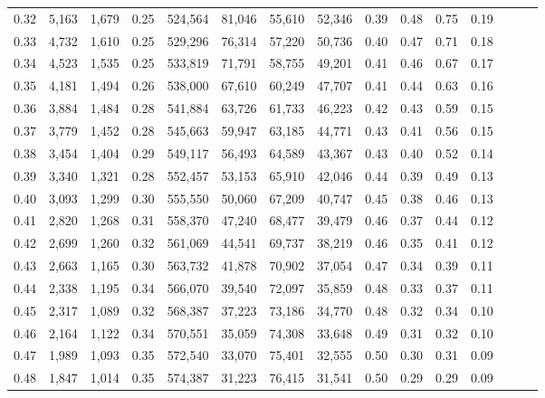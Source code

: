 \begin{tabular}{rrrrrrrrrrrrrrr}
0.32 &   5,163 &  1,679 &  0.25 &  524,564 &   81,046 &   55,610 &   52,346 &  0.39 &  0.48 &  0.75 &      0.19 \\
0.33 &   4,732 &  1,610 &  0.25 &  529,296 &   76,314 &   57,220 &   50,736 &  0.40 &  0.47 &  0.71 &      0.18 \\
0.34 &   4,523 &  1,535 &  0.25 &  533,819 &   71,791 &   58,755 &   49,201 &  0.41 &  0.46 &  0.67 &      0.17 \\
0.35 &   4,181 &  1,494 &  0.26 &  538,000 &   67,610 &   60,249 &   47,707 &  0.41 &  0.44 &  0.63 &      0.16 \\
0.36 &   3,884 &  1,484 &  0.28 &  541,884 &   63,726 &   61,733 &   46,223 &  0.42 &  0.43 &  0.59 &      0.15 \\
0.37 &   3,779 &  1,452 &  0.28 &  545,663 &   59,947 &   63,185 &   44,771 &  0.43 &  0.41 &  0.56 &      0.15 \\
0.38 &   3,454 &  1,404 &  0.29 &  549,117 &   56,493 &   64,589 &   43,367 &  0.43 &  0.40 &  0.52 &      0.14 \\
0.39 &   3,340 &  1,321 &  0.28 &  552,457 &   53,153 &   65,910 &   42,046 &  0.44 &  0.39 &  0.49 &      0.13 \\
0.40 &   3,093 &  1,299 &  0.30 &  555,550 &   50,060 &   67,209 &   40,747 &  0.45 &  0.38 &  0.46 &      0.13 \\
0.41 &   2,820 &  1,268 &  0.31 &  558,370 &   47,240 &   68,477 &   39,479 &  0.46 &  0.37 &  0.44 &      0.12 \\
0.42 &   2,699 &  1,260 &  0.32 &  561,069 &   44,541 &   69,737 &   38,219 &  0.46 &  0.35 &  0.41 &      0.12 \\
0.43 &   2,663 &  1,165 &  0.30 &  563,732 &   41,878 &   70,902 &   37,054 &  0.47 &  0.34 &  0.39 &      0.11 \\
0.44 &   2,338 &  1,195 &  0.34 &  566,070 &   39,540 &   72,097 &   35,859 &  0.48 &  0.33 &  0.37 &      0.11 \\
0.45 &   2,317 &  1,089 &  0.32 &  568,387 &   37,223 &   73,186 &   34,770 &  0.48 &  0.32 &  0.34 &      0.10 \\
0.46 &   2,164 &  1,122 &  0.34 &  570,551 &   35,059 &   74,308 &   33,648 &  0.49 &  0.31 &  0.32 &      0.10 \\
0.47 &   1,989 &  1,093 &  0.35 &  572,540 &   33,070 &   75,401 &   32,555 &  0.50 &  0.30 &  0.31 &      0.09 \\
0.48 &   1,847 &  1,014 &  0.35 &  574,387 &   31,223 &   76,415 &   31,541 &  0.50 &  0.29 &  0.29 &      0.09 \\

\end{tabular}
